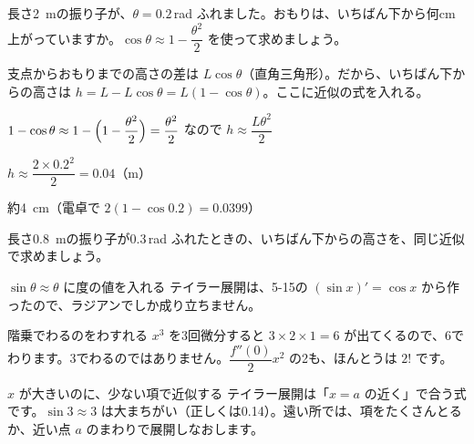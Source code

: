 \begin{reidai}
長さ\qty{2}{m}の振り子が、$\theta=0.2$\,rad ふれました。おもりは、いちばん下から何cm上がっていますか。$\cos\theta\approx1-\dfrac{\theta^2}{2}$ を使って求めましょう。\par
\kangaekata 支点からおもりまでの高さの差は $L\cos\theta$（直角三角形）。だから、いちばん下からの高さは $h=L-L\cos\theta=L(1-\cos\theta)$。ここに近似の式を入れる。\par
\shiki $1-\cos\theta\approx1-\Bigl(1-\dfrac{\theta^2}{2}\Bigr)=\dfrac{\theta^2}{2}$ なので $h\approx\dfrac{L\theta^2}{2}$\par
\hspace*{2.6\zw}$h\approx\dfrac{2\times0.2^2}{2}=0.04$（m）\par
\kotae 約\qty{4}{cm}（電卓で $2(1-\cos0.2)=0.0399$）
\end{reidai}

\begin{jibun}
長さ\qty{0.8}{m}の振り子が0.3\,rad ふれたときの、いちばん下からの高さを、同じ近似で求めましょう。
\end{jibun}


\begin{tsumazuki}{$\sin\theta\approx\theta$ に度の値を入れる}
テイラー展開は、5-15の $(\sin x)'=\cos x$ から作ったので、ラジアンでしか成り立ちません。
\end{tsumazuki}

\begin{tsumazuki}{階乗でわるのをわすれる}
$x^3$ を3回微分すると $3\times2\times1=6$ が出てくるので、6でわります。3でわるのではありません。$\dfrac{f''(0)}{2}x^2$ の2も、ほんとうは $2!$ です。
\end{tsumazuki}

\begin{tsumazuki}{$x$ が大きいのに、少ない項で近似する}
テイラー展開は「$x=a$ の近く」で合う式です。$\sin3\approx3$ は大まちがい（正しくは0.14）。遠い所では、項をたくさんとるか、近い点 $a$ のまわりで展開しなおします。
\end{tsumazuki}

